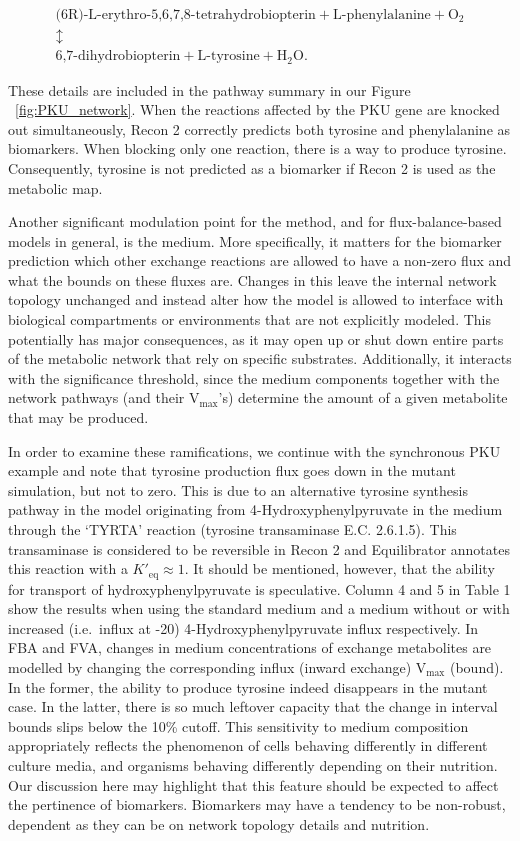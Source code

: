 \documentclass[10pt,a4paper,onecolumn]{article}
\begin{document}
\begin{gather*}
\text{(6R)-L-erythro-5,6,7,8-tetrahydrobiopterin} + \text{L-phenylalanine} + \text{O}_2 \\
 \updownarrow \\
\text{6,7-dihydrobiopterin} + \text{L-tyrosine} + \text{H}_2\text{O}.
\end{gather*}

These details are included in the pathway summary in our Figure
~\ref{fig:PKU_network}. When the reactions affected by the PKU gene are
knocked out simultaneously, Recon 2 correctly predicts both tyrosine and
phenylalanine as biomarkers. When blocking only one reaction, there is a
way to produce tyrosine. Consequently, tyrosine is not predicted as a
biomarker if Recon 2 is used as the metabolic map.

Another significant modulation point for the method, and for
flux-balance-based models in general, is the medium. More specifically,
it matters for the biomarker prediction which other exchange reactions
are allowed to have a non-zero flux and what the bounds on these fluxes
are. Changes in this leave the internal network topology unchanged and
instead alter how the model is allowed to interface with biological
compartments or environments that are not explicitly modeled. This
potentially has major consequences, as it may open up or shut down
entire parts of the metabolic network that rely on specific substrates.
Additionally, it interacts with the significance threshold, since the
medium components together with the network pathways (and their
V\(_{\text{max}}\)'s) determine the amount of a given metabolite that
may be produced.

In order to examine these ramifications, we continue with the
synchronous PKU example and note that tyrosine production flux goes down
in the mutant simulation, but not to zero. This is due to an alternative
tyrosine synthesis pathway in the model originating from
4-Hydroxyphenylpyruvate in the medium through the `TYRTA' reaction
(tyrosine transaminase E.C. 2.6.1.5). This transaminase is considered to
be reversible in Recon 2 and Equilibrator \autocite{Noor2012} annotates
this reaction with a \(K'_{\text{eq}} \approx 1\). It should be
mentioned, however, that the ability for transport of
hydroxyphenylpyruvate is speculative. Column 4 and 5 in Table 1 show the
results when using the standard medium and a medium without or with
increased (i.e.~influx at -20) 4-Hydroxyphenylpyruvate influx
respectively. In FBA and FVA, changes in medium concentrations of
exchange metabolites are modelled by changing the corresponding influx
(inward exchange) V\(_{\text{max}}\) (bound). In the former, the ability
to produce tyrosine indeed disappears in the mutant case. In the latter,
there is so much leftover capacity that the change in interval bounds
slips below the 10\% cutoff. This sensitivity to medium composition
appropriately reflects the phenomenon of cells behaving differently in
different culture media, and organisms behaving differently depending on
their nutrition. Our discussion here may highlight that this feature
should be expected to affect the pertinence of biomarkers. Biomarkers
may have a tendency to be non-robust, dependent as they can be on
network topology details and nutrition.
\end{document}
